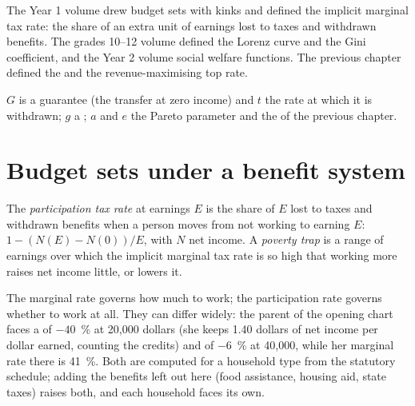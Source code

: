 \begin{recall}
The Year 1 volume drew budget sets with kinks and defined the implicit marginal
tax rate: the share of an extra unit of earnings lost to taxes and withdrawn
benefits. The grades 10--12 volume defined the Lorenz curve and the Gini
coefficient, and the Year 2 volume social welfare functions. The previous chapter
defined the  and the revenue-maximising top rate.
\end{recall}

\begin{notation}\label{not:b3:transfers-and-incentives:symbols}
$G$ is a guarantee (the transfer at zero income) and $t$ the rate at which it is
withdrawn; $g$ a ; $a$ and $e$ the Pareto parameter and the
 of the previous chapter.
\end{notation}

\section{Budget sets under a benefit system}\label{sec:b3:transfers-and-incentives:budget}

\begin{definition}\label{def:b3:transfers-and-incentives:ptr}
The \emph{participation tax rate} at earnings $E$ is the share of $E$ lost to taxes and
withdrawn benefits when a person moves from not working to earning $E$: $1 - (N(E) - N(0))/E$,
with $N$ net income. A \emph{poverty trap} is a range of earnings over which the
implicit marginal tax rate is so high that working more raises net income little,
or lowers it.
\end{definition}

\begin{measure}
The marginal rate governs how much to work; the participation rate governs whether
to work at all. They can differ widely: the parent of the opening chart faces a
 of $-40$~\% at 20{,}000 dollars (she keeps 1.40 dollars of net
income per dollar earned, counting the credits) and of $-6$~\% at 40{,}000, while her
marginal rate there is 41~\%. %
Both are computed for a household type from the statutory schedule; adding the
benefits left out here (food assistance, housing aid, state taxes) raises both, and
each household faces its own.
\end{measure}

